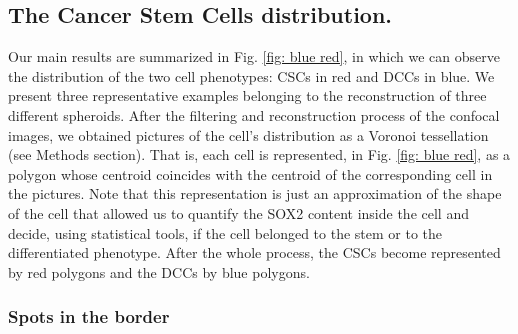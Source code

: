 \documentclass[fleqn,10pt]{wlscirep}
\begin{document}


\subsection*{The Cancer Stem Cells distribution. }

Our main results are summarized in Fig. \ref{fig: blue red}, in which we can observe the distribution of the two cell phenotypes:  CSCs in red and DCCs in blue. We present three representative examples belonging to the reconstruction of three different spheroids. After the filtering and reconstruction process of the confocal images, we obtained pictures of the cell's distribution as a Voronoi tessellation (see Methods section). That is, each cell is represented, in Fig. \ref{fig: blue red}, as a polygon whose centroid coincides with the centroid of the corresponding cell in the pictures. Note that this representation is just an approximation of the shape of the cell that allowed us to quantify the SOX2 content inside the cell and decide, using statistical tools, if the cell belonged  to the stem or to the differentiated phenotype. After the whole process, the CSCs become represented by red polygons and the DCCs by blue polygons. 

\subsubsection*{Spots in the border}
\end{document}
